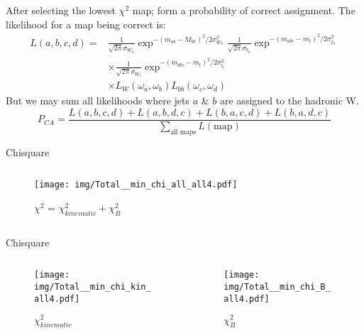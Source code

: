 \documentclass{beamer}
\begin{document}
\begin{frame}
After selecting the lowest $\chi^2$ map; form a probability of correct assignment. The likelihood for a map being correct is:
  \begin{equation}\begin{split}
    L\left(a,b,c,d\right) =&
    \frac{1}{\sqrt{2\pi}\sigma_{W_{h}}} \exp^{-\left(m_{ab}-M_{W}\right)^{2} / 2\sigma^{2}_{W_{h}}}
    \frac{1}{\sqrt{2\pi}\sigma_{t_{h}}} \exp^{-\left(m_{abc}-m_{t}\right)^{2} / 2\sigma^{2}_{t_{h}}}
    \\&\times
    \frac{1}{\sqrt{2\pi}\sigma_{W_{l}}} \exp^{-\left(m_{dl\nu}-m_{t}\right)^{2} / 2\sigma^{2}_{t_{l}}}
    \\&\times
    L_{W}\left(\omega_{a},\omega_{b}\right) L_{bb}\left(\omega_{c},\omega_{d}\right)
  \end{split}\end{equation}
But we may sum all likelihoods where jets $a$ \& $b$ are assigned to the hadronic W.
\begin{equation}
P_{CA} = \frac{L\left(a,b,c,d\right) + L\left(a,b,d,c\right) + L\left(b,a,c,d\right) + L\left(b,a,d,c\right)}{\sum_{\text{all maps}} L\left(\text{map}\right)}
\end{equation}
\end{frame}

\begin{frame}{Chisquare}
  \begin{columns}
    \begin{column}{0.45\textwidth}\begin{figure}
      \caption{$\chi^2$ = $\chi^2_{kinematic} + \chi^2_{B}$}
      \texttt{[image: img/Total\_\_min\_chi\_all\_all4.pdf]}
    \end{figure}\end{column}
  \end{columns}
\end{frame}

\begin{frame}{Chisquare}
  \begin{columns}
    \begin{column}{0.45\textwidth}\begin{figure}
      \caption{$\chi^2_{kinematic}$}
      \texttt{[image: img/Total\_\_min\_chi\_kin\_all4.pdf]}
    \end{figure}\end{column}
    \begin{column}{0.45\textwidth}\begin{figure}
      \caption{$\chi^2_{B}$}
      \texttt{[image: img/Total\_\_min\_chi\_B\_all4.pdf]}
    \end{figure}\end{column}
  \end{columns}
\end{frame}
\end{document}

